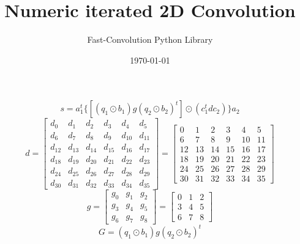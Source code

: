 \documentclass{article}%
\title{Numeric iterated 2D Convolution}%
\author{Fast{-}Convolution Python Library}%
\date{\today}%
\begin{document}
%
\normalsize%
\maketitle%
\[%
s=a_1^t \{[(q_1 \odot b_1) g (q_2 \odot b_2)^t] \odot (c_1^t d c_2)\}a_2%
\]%
\[%
d = \left[\begin{matrix}d_{0} & d_{1} & d_{2} & d_{3} & d_{4} & d_{5}\\d_{6} & d_{7} & d_{8} & d_{9} & d_{10} & d_{11}\\d_{12} & d_{13} & d_{14} & d_{15} & d_{16} & d_{17}\\d_{18} & d_{19} & d_{20} & d_{21} & d_{22} & d_{23}\\d_{24} & d_{25} & d_{26} & d_{27} & d_{28} & d_{29}\\d_{30} & d_{31} & d_{32} & d_{33} & d_{34} & d_{35}\end{matrix}\right] = \left[\begin{matrix}0 & 1 & 2 & 3 & 4 & 5\\6 & 7 & 8 & 9 & 10 & 11\\12 & 13 & 14 & 15 & 16 & 17\\18 & 19 & 20 & 21 & 22 & 23\\24 & 25 & 26 & 27 & 28 & 29\\30 & 31 & 32 & 33 & 34 & 35\end{matrix}\right]%
\]%
\[%
g = \left[\begin{matrix}g_{0} & g_{1} & g_{2}\\g_{3} & g_{4} & g_{5}\\g_{6} & g_{7} & g_{8}\end{matrix}\right] = \left[\begin{matrix}0 & 1 & 2\\3 & 4 & 5\\6 & 7 & 8\end{matrix}\right]%
\]%
\[%
G = (q_1 \odot b_1) g (q_2 \odot b_2)^t%
\]%
\end{document}
